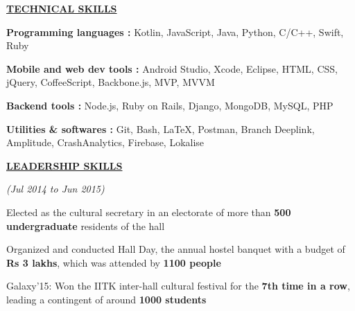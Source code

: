 \documentclass[a4paper]{deedy-resume} %
\begin{document}
{\uppercase\uline{\textbf{\large{Technical Skills}}\hfill}}
\microspace
\begin{tightitemize}
\item \textbf{Programming languages \hspace{10pt}:  } Kotlin, JavaScript, Java, Python, C/C++, Swift, Ruby
\item \textbf{Mobile and web dev tools   \hspace{1pt} : } Android Studio, Xcode, Eclipse, HTML, CSS, jQuery, CoffeeScript, Backbone.js, MVP, MVVM 
\item \textbf{Backend tools  \hspace{51pt} : }   Node.js, Ruby on Rails, Django, MongoDB, MySQL, PHP
\item \textbf{Utilities \& softwares \hspace{27pt}: } Git, Bash, \LaTeX, Postman, Branch Deeplink, Amplitude, CrashAnalytics, Firebase, Lokalise
\end{tightitemize}
\sectionspace
{\uppercase\uline{\textbf{\large{Leadership Skills}}\hfill}}

\microspace
{}
\hfill {\textit{\small(Jul 2014 to Jun 2015)}}\\
\begin{tightitemize}
\item Elected as the cultural secretary in an electorate of more than \textbf{500 undergraduate} residents of the hall
\item Organized and conducted Hall Day, the annual hostel banquet with a budget of \textbf{Rs 3 lakhs}, which was attended by \textbf{1100 people}
\item Galaxy'15: Won the IITK inter-hall cultural festival for the \textbf{7th time in a row}, leading a contingent of around \textbf{1000 students}
\end{tightitemize}



\end{document}
